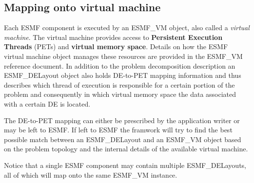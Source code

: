 \subsection{Mapping onto virtual machine}
Each ESMF component is executed by an ESMF\_VM object, also called a {\em virtual machine}. The virtual machine provides access to {\bf Persistent Execution Threads} (PETs) and {\bf virtual memory space}. Details on how the ESMF virtual machine object manages these resources are provided in the ESMF\_VM reference document. In addition to the problem decomposition description an ESMF\_DELayout object also holds DE-to-PET mapping information and thus describes which thread of execution is responsible for a certain portion of the problem and consequently in which virtual memory space the data associated with a certain DE is located.

The DE-to-PET mapping can either be prescribed by the application writer or may be left to ESMF. If left to ESMF the framwork will try to find the best possible match between an ESMF\_DELayout and an ESMF\_VM object based on the problem topology and the internal details of the available virtual machine.

Notice that a single ESMF component may contain multiple ESMF\_DELayouts, all of which will map onto the same ESMF\_VM instance. 






